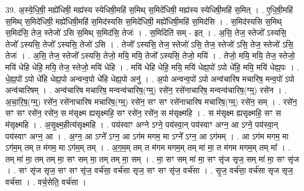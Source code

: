 \documentclass[17pt]{extarticle}
\begin{document}
39. अ॒स्ये॒धि॒षी॒ मह्ये॑धिषी॒ मह्य॑स्य स्येधिषी॒महि॑ स॒मिथ् स॒मिदे॑धिषी॒ मह्य॑स्य स्येधिषी॒महि॑ स॒मित् । . ए॒धि॒षी॒महि॑ स॒मिथ् स॒मिदे॑धिषी॒ मह्ये॑धिषी॒महि॑ स॒मिद॑स्यसि स॒मिदे॑धिषी॒ मह्ये॑धिषी॒महि॑ स॒मिद॑सि । . स॒मिद॑स्यसि स॒मिथ् स॒मिद॑सि॒ तेज॒ स्तेजो॑ ऽसि स॒मिथ् स॒मिद॑सि॒ तेजः॑ । . स॒मिदिति॑ सम् - इत् । . अ॒सि॒ तेज॒ स्तेजो᳚ ऽस्यसि॒ तेजो᳚ ऽस्यसि॒ तेजो᳚ ऽस्यसि॒ तेजो॑ ऽसि । . तेजो᳚ ऽस्यसि॒ तेज॒ स्तेजो॑ ऽसि॒ तेज॒ स्तेजो॑ ऽसि॒ तेज॒ स्तेजो॑ ऽसि॒ तेजः॑ । . अ॒सि॒ तेज॒ स्तेजो᳚ ऽस्यसि॒ तेजो॒ मयि॒ मयि॒ तेजो᳚ ऽस्यसि॒ तेजो॒ मयि॑ । . तेजो॒ मयि॒ मयि॒ तेज॒ स्तेजो॒ मयि॑ धेहि धेहि॒ मयि॒ तेज॒ स्तेजो॒ मयि॑ धेहि । . मयि॑ धेहि धेहि॒ मयि॒ मयि॑ धेह्य॒पो॑ ऽपो धे॑हि॒ मयि॒ मयि॑ धेह्य॒पः । . धे॒ह्य॒पो॑ ऽपो धे॑हि धेह्य॒पो अन्वन्व॒पो धे॑हि धेह्य॒पो अनु॑ । . अ॒पो अन्वन्व॒पो॑ ऽपो अन्व॑चारिष मचारिष॒ मन्व॒पो॑ ऽपो अन्व॑चारिषम् । . अन्व॑चारिष मचारिष॒ मन्वन्व॑चारिष॒(ग्म्॒) रसे॑न॒ रसे॑नाचारिष॒ मन्वन्व॑चारिष॒(ग्म्॒) रसे॑न । . अ॒चा॒रि॒ष॒(ग्म्॒) रसे॑न॒ रसे॑नाचारिष मचारिष॒(ग्म्॒) रसे॑न॒ सꣳ सꣳ रसे॑नाचारिष मचारिष॒(ग्म्॒) रसे॑न॒ सम् । . रसे॑न॒ सꣳ सꣳ रसे॑न॒ रसे॑न॒ स म॑सृक्ष्म ह्यसृक्ष्महि॒ सꣳ रसे॑न॒ रसे॑न॒ स म॑सृक्ष्महि । . स म॑सृक्ष्म ह्यसृक्ष्महि॒ सꣳ स म॑सृक्ष्महि । . अ॒सृ॒क्ष्म॒हीत्य॑सृक्ष्महि । . पय॑स्वाꣳ अग्ने ऽग्ने॒ पय॑स्वा॒न् पय॑स्वाꣳ अग्न॒ आ ऽग्ने॒ पय॑स्वा॒न् पय॑स्वाꣳ अग्न॒ आ । . अ॒ग्न॒ आ ऽग्ने᳚ ऽग्न॒ आ ऽग॑म मगम॒ मा ऽग्ने᳚ ऽग्न॒ आ ऽग॑मम् । . आ ऽग॑म मगम॒ मा ऽग॑म॒म् तम् त म॑गम॒ मा ऽग॑म॒म् तम् । . अ॒ग॒म॒म् तम् त म॑गम मगम॒म् तम् मा॑ मा॒ त म॑गम मगम॒म् तम् मा᳚ । . तम् मा॑ मा॒ तम् तम् मा॒ सꣳ सम् मा॒ तम् तम् मा॒ सम् । . मा॒ सꣳ सम् मा॑ मा॒ सꣳ सृ॑ज सृज॒ सम् मा॑ मा॒ सꣳ सृ॑ज । . सꣳ सृ॑ज सृज॒ सꣳ सꣳ सृ॑ज॒ वर्च॑सा॒ वर्च॑सा सृज॒ सꣳ सꣳ सृ॑ज॒ वर्च॑सा । . सृ॒ज॒ वर्च॑सा॒ वर्च॑सा सृज सृज॒ वर्च॑सा । . वर्च॒सेति॒ वर्च॑सा । \newline
\pagebreak
{}
\end{document}
